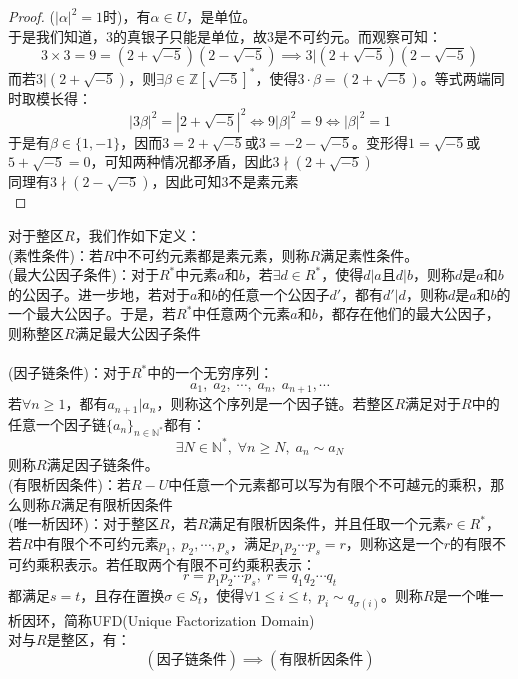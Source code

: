 \begin{proof}
(${|\alpha|}^2=1$时)，有$\alpha\in U$，是单位。\\
\indent 于是我们知道，$3$的真银子只能是单位，故$3$是不可约元。而观察可知：
\[
3\times 3=9 =(2+\sqrt{-5})(2-\sqrt{-5})\implies 3|(2+\sqrt{-5})(2-\sqrt{-5})
\]
\indent 而若$3|(2+\sqrt{-5})$，则$\exists \beta\in {\mathbb{Z}[\sqrt{-5}]}^*$，使得$3\cdot \beta=(2+\sqrt{-5})$。等式两端同时取模长得：
\[
{|3\beta|}^2={|2+\sqrt{-5}|}^2\iff 9{|\beta|}^2=9\iff {|\beta|}^2=1
\]
\indent 于是有$\beta\in \{1,-1\}$，因而$3=2+\sqrt{-5}$或$3=-2-\sqrt{-5}$。变形得$1=\sqrt{-5}$或$5+\sqrt{-5}=0$，可知两种情况都矛盾，因此$3\nmid (2+\sqrt{-5})$\\
\indent 同理有$3\nmid (2-\sqrt{-5})$，因此可知$3$不是素元素\\
\end{proof}

对于整区$R$，我们作如下定义：\\
\indent (素性条件)：若$R$中不可约元素都是素元素，则称$R$满足素性条件。\\
\indent (最大公因子条件)：对于$R^*$中元素$a$和$b$，若$\exists d\in R^*$，使得$d|a$且$d|b$，则称$d$是$a$和$b$的公因子。进一步地，若对于$a$和$b$的任意一个公因子$d'$，都有$d'|d$，则称$d$是$a$和$b$的一个最大公因子。于是，若$R^*$中任意两个元素$a$和$b$，都存在他们的最大公因子，则称整区$R$满足最大公因子条件\\
\indent {}\\
\indent (因子链条件)：对于$R^*$中的一个无穷序列：
\[
a_1,\; a_2,\; \cdots ,\;a_n,\;a_{n+1},\cdots
\]
若$\forall n\geq 1$，都有$a_{n+1}|a_n$，则称这个序列是一个因子链。若整区$R$满足对于$R$中的任意一个因子链${\{a_n\}}_{n\in \mathbb{N}^*}$都有：
\[
\exists N\in \mathbb{N}^*,\; \forall n\geq N,\; a_n\sim a_N
\]
则称$R$满足因子链条件。\\
\indent (有限析因条件)：若$R-U$中任意一个元素都可以写为有限个不可越元的乘积，那么则称$R$满足有限析因条件\\
(唯一析因环)：对于整区$R$，若$R$满足有限析因条件，并且任取一个元素$r\in R^*$，若$R$中有限个不可约元素$p_1,\; p_2,\cdots,p_s$，满足$p_1p_2\cdots p_s=r$，则称这是一个$r$的有限不可约乘积表示。若任取两个有限不可约乘积表示：
\[
r=p_1p_2\cdots p_s,\; r=q_1q_2\cdots q_t
\]
都满足$s=t$，且存在置换$\sigma\in S_t$，使得$\forall 1\leq i\leq t,\; p_i\sim q_{\sigma(i)}$。则称$R$是一个唯一析因环，简称UFD(Unique Factorization Domain)\\
对与$R$是整区，有：
\[
(\text{因子链条件})\implies (\text{有限析因条件})
\]

